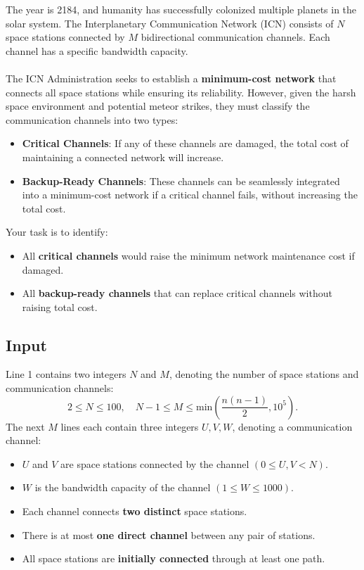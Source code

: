 \documentclass[12pt,a4paper]{article}
\begin{document}
\noindent
The year is 2184, and humanity has successfully colonized multiple planets in the solar system. The Interplanetary Communication Network (ICN) consists of \( N \) space stations connected by \( M \) bidirectional communication channels. Each channel has a specific bandwidth capacity.
\\\\
\noindent
The ICN Administration seeks to establish a \textbf{minimum-cost network} that connects all space stations while ensuring its reliability. However, given the harsh space environment and potential meteor strikes, they must classify the communication channels into two types:

\begin{itemize}
    \item \textbf{Critical Channels}: If any of these channels are damaged, the total cost of maintaining a connected network will increase.
    \item \textbf{Backup-Ready Channels}: These channels can be seamlessly integrated into a minimum-cost network if a critical channel fails, without increasing the total cost.
\end{itemize}

\noindent
Your task is to identify:
\begin{itemize}
    \item All \textbf{critical channels }would raise the minimum network maintenance cost if damaged.
    \item All \textbf{backup-ready channels} that can replace critical channels without raising total cost.
\end{itemize}

\subsection*{\fontsize{16}{12}Input}
Line 1 contains two integers \( N \) and \( M \), denoting the number of space stations and communication channels:
    \[
    2 \leq N \leq 100, \quad N-1 \leq M \leq \text{min}(\frac{n(n-1)}{2},10^5).
    \]
\noindent
The next \( M \) lines each contain three integers \( U, V, W \), denoting a communication channel:
    \begin{itemize}
        \item \( U \) and \( V \) are space stations connected by the channel \((0 \leq U, V < N)\).
        \item \( W \) is the bandwidth capacity of the channel \((1 \leq W \leq 1000)\).
        \item Each channel connects \textbf{two distinct} space stations.
        \item There is at most \textbf{one direct channel} between any pair of stations.
        \item All space stations are \textbf{initially connected} through at least one path.
    \end{itemize}
\end{document}
